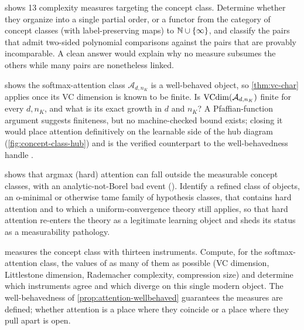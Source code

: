 \begin{openprob}
\label{op:dimension-multiplicity}
 shows 13 complexity measures targeting the concept class. Determine whether they organize into a single partial order, or a functor from the category of concept classes (with label-preserving maps) to $\mathbb{N} \cup \{\infty\}$, and classify the pairs that admit two-sided polynomial comparisons against the pairs that are provably incomparable. A clean answer would explain why no measure subsumes the others while many pairs are nonetheless linked.
\end{openprob}

\begin{openprob}
\label{op:attention-vc-objects}
 shows the softmax-attention class $\mathcal{A}_{d,n_K}$ is a well-behaved object, so \cref{thm:vc-char} applies once its VC dimension is known to be finite.  Is $\mathrm{VCdim}(\mathcal{A}_{d,n_K})$ finite for every $d, n_K$, and what is its exact growth in $d$ and $n_K$?  A Pfaffian-function argument suggests finiteness, but no machine-checked bound exists; closing it would place attention definitively on the learnable side of the hub diagram (\cref{fig:concept-class-hub}) and is the verified counterpart to the well-behavedness handle .
\end{openprob}

\begin{openprob}
\label{op:hard-attention-object}
 shows that argmax (hard) attention can fall outside the measurable concept classes, with an analytic-not-Borel bad event ().  Identify a refined class of objects, an o-minimal or otherwise tame family of hypothesis classes, that contains hard attention and to which a uniform-convergence theory still applies, so that hard attention re-enters the theory as a legitimate learning object and sheds its status as a measurability pathology.
\end{openprob}

\begin{openprob}
\label{op:attention-hub}
 measures the concept class with thirteen instruments.  Compute, for the softmax-attention class, the values of as many of them as possible (VC dimension, Littlestone dimension, Rademacher complexity, compression size) and determine which instruments agree and which diverge on this single modern object.  The well-behavedness of \cref{prop:attention-wellbehaved} guarantees the measures are defined; whether attention is a place where they coincide or a place where they pull apart is open.
\end{openprob}

